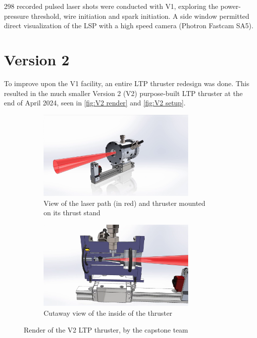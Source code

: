         298 recorded pulsed laser shots were conducted with V1, exploring the power-pressure threshold, wire initiation and spark initiation. A side window permitted direct visualization of the LSP with a high speed camera (Photron Fastcam SA5).

    \section{Version 2} \label{sec:design_v2}

        To improve upon the V1 facility, an entire LTP thruster redesign was done. This resulted in the much smaller Version 2 (V2) purpose-built LTP thruster at the end of April 2024, seen in \autoref{fig:V2 render} and \autoref{fig:V2 setup}.

        \begin{figure}[!ht]
            \centering
            \begin{subfigure}[t]{\textwidth}
                \centering
                \includegraphics[width=0.85\textwidth]{assets/3 design/V2 render 45 view.png}
                \caption{View of the laser path (in red) and thruster mounted on its thrust stand}
            \end{subfigure}
            \hfill
            \begin{subfigure}[t]{\textwidth}
                \centering
                \includegraphics[width=0.85\textwidth]{assets/3 design/V2 render cutout.png}
                \caption{Cutaway view of the inside of the thruster}
            \end{subfigure}
            \caption{Render of the V2 LTP thruster, by the capstone team}
            \label{fig:V2 render}
        \end{figure}

